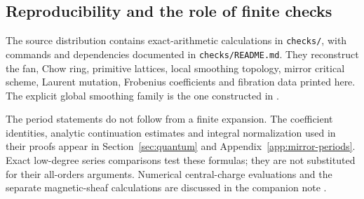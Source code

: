 \subsection{Reproducibility and the role of finite checks}

The source distribution contains exact-arithmetic calculations
in \texttt{checks/}, with commands and dependencies documented
in \texttt{checks/README.md}. They reconstruct the fan, Chow
ring, primitive lattices, local smoothing topology, mirror
critical scheme, Laurent mutation, Frobenius coefficients and
fibration data printed here. The explicit global smoothing
family is the one constructed in \cite{Wuebben:2026smoothing}.

The period statements do not follow from a finite expansion.
The coefficient identities, analytic continuation estimates
and integral normalization used in their proofs appear in
Section~\ref{sec:quantum} and Appendix~\ref{app:mirror-periods}.
Exact low-degree series comparisons test these formulas; they
are not substituted for their all-orders arguments. Numerical
central-charge evaluations and the separate magnetic-sheaf
calculations are discussed in the companion note
\cite{Wuebben:2026magnetic}.
